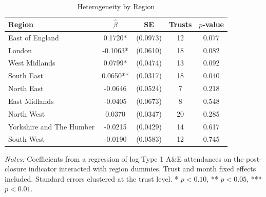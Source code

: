 \begin{table}[htbp]
\centering
\caption{Heterogeneity by Region}
\label{tab:region}
\begin{tabular}{lcccc}
\hline\hline
Region & $\hat{\beta}$ & SE & Trusts & $p$-value \\
\hline
East of England & 0.1720* & (0.0973) & 12 & 0.077 \\
London & -0.1063* & (0.0610) & 18 & 0.082 \\
West Midlands & 0.0799* & (0.0474) & 13 & 0.092 \\
South East & 0.0650** & (0.0317) & 18 & 0.040 \\
North East & -0.0646 & (0.0524) & 7 & 0.218 \\
East Midlands & -0.0405 & (0.0673) & 8 & 0.548 \\
North West & 0.0370 & (0.0347) & 20 & 0.285 \\
Yorkshire and The Humber & -0.0215 & (0.0429) & 14 & 0.617 \\
South West & -0.0190 & (0.0583) & 12 & 0.745 \\
\hline\hline
\end{tabular}
\begin{tablenotes}[flushleft]
\small
\item \textit{Notes:} Coefficients from a regression of log Type 1 A\&E attendances on the post-closure indicator interacted with region dummies. Trust and month fixed effects included. Standard errors clustered at the trust level. * $p < 0.10$, ** $p < 0.05$, *** $p < 0.01$.
\end{tablenotes}
\end{table}
